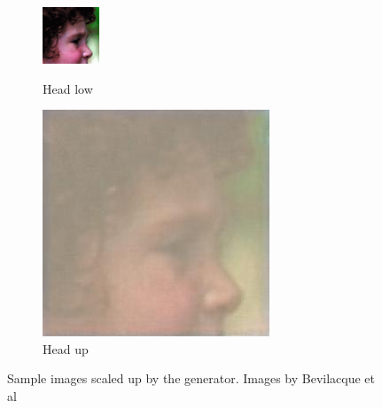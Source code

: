 \documentclass[11pt,twocolumn,twoside,paper=a4]{IEEEtran}
\begin{document}
\begin{figure}[ht]
\par\bigskip

\begin{subfigure}{0.45\textwidth}
  \centering
  \begin{minipage}[b]{0.45\textwidth}
    \includegraphics[width=\textwidth]{../images/head_low.jpg}
    \caption{Head low}
  \end{minipage}
  \hfill
  \begin{minipage}[b]{0.45\textwidth}
    \includegraphics[width=\textwidth]{../images/head_up.jpg}
    \caption{Head up}
  \end{minipage}
\end{subfigure}


\label{fig:sample_images}
\caption{Sample images scaled up by the generator. Images by Bevilacque et al~\cite{BMVC.26.135}}
\end{figure}
\end{document}
